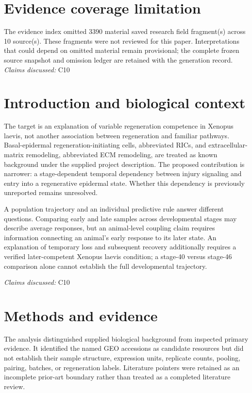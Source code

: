 \documentclass[11pt]{article}
\begin{document}
\section*{Evidence coverage limitation}
The evidence index omitted 3390 material saved research field fragment(s) across 10 source(s). These fragments were not reviewed for this paper. Interpretations that could depend on omitted material remain provisional; the complete frozen source snapshot and omission ledger are retained with the generation record.
\textit{Claims discussed: }C10
\section{Introduction and biological context}
The target is an explanation of variable regeneration competence in Xenopus laevis, not another association between regeneration and familiar pathways. Basal-epidermal regeneration-initiating cells, abbreviated RICs, and extracellular-matrix remodeling, abbreviated ECM remodeling, are treated as known background under the supplied project description. The proposed contribution is narrower: a stage-dependent temporal dependency between injury signaling and entry into a regenerative epidermal state. Whether this dependency is previously unreported remains unresolved.

A population trajectory and an individual predictive rule answer different questions. Comparing early and late samples across developmental stages may describe average responses, but an animal-level coupling claim requires information connecting an animal's early response to its later state. An explanation of temporary loss and subsequent recovery additionally requires a verified later-competent Xenopus laevis condition; a stage-40 versus stage-46 comparison alone cannot establish the full developmental trajectory.

\textit{Claims discussed: }C10
\section{Methods and evidence}
The analysis distinguished supplied biological background from inspected primary evidence. It identified the named GEO accessions as candidate resources but did not establish their sample structure, expression units, replicate counts, pooling, pairing, batches, or regeneration labels. Literature pointers were retained as an incomplete prior-art boundary rather than treated as a completed literature review.
\end{document}
